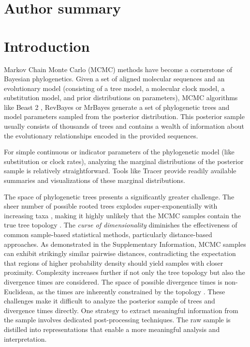 \documentclass[10pt,letterpaper]{article}
\begin{document}
\section*{Author summary}


\linenumbers

\section*{Introduction}

Markov Chain Monte Carlo (MCMC) methods have become a cornerstone of Bayesian phylogenetics. Given a set of aligned molecular sequences and an evolutionary model (consisting of a tree model, a molecular clock model, a substitution model, and prior distributions on parameters), MCMC algorithms like Beast 2 \cite{beast2}, RevBayes \cite{revbayes} or MrBayes \cite{mrbayes} generate a set of phylogenetic trees and model parameters sampled from the posterior distribution. This posterior sample usually consists of thousands of trees and contains a wealth of information about the evolutionary relationships encoded in the provided sequences.

For simple continuous or indicator parameters of the phylogenetic model (like substitution or clock rates), analyzing the marginal distributions of the posterior sample is relatively straightforward. Tools like Tracer \cite{tracer} provide readily available summaries and visualizations of these marginal distributions.

The space of phylogenetic trees presents a significantly greater challenge. The sheer number of possible rooted trees explodes super-exponentially with increasing taxa \cite{steelsemple}, making it highly unlikely that the MCMC samples contain the true tree topology \cite{ccd}. The \emph{curse of dimensionality} \cite{curse,curse2} diminishes the effectiveness of common sample-based statistical methods, particularly distance-based approaches. As demonstrated in the Supplementary Information, MCMC samples can exhibit strikingly similar pairwise distances, contradicting the expectation that regions of higher probability density should yield samples with closer proximity. Complexity increases further if not only the tree topology but also the divergence times are considered. The space of possible divergence times is non-Euclidean, as the times are inherently constrained by the topology \cite{steelsemple,wald,tauspace,tropical,bhv,cube}. These challenges make it difficult to analyze the posterior sample of trees and divergence times directly. One strategy to extract meaningful information from the sample involves dedicated post-processing techniques. The raw sample is distilled into representations that enable a more meaningful analysis and interpretation.
\end{document}
